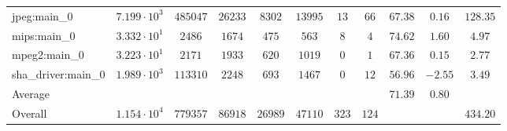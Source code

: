 \begin{tabular}{|l|c|c|c|c|c|c|c|c|c|c|}
jpeg:main\_0            & $ 7.199 \cdot 10^{3} $ & $ 485047 $ & $ 26233 $ & $ 8302  $ & $ 13995 $ & $ 13  $ & $ 66  $ & $ 67.38       $ & $ 0.16    $ & $ 128.35  $ \\
mips:main\_0            & $ 3.332 \cdot 10^{1} $ & $ 2486   $ & $ 1674  $ & $ 475   $ & $ 563   $ & $ 8   $ & $ 4   $ & $ 74.62       $ & $ 1.60    $ & $ 4.97    $ \\
mpeg2:main\_0           & $ 3.223 \cdot 10^{1} $ & $ 2171   $ & $ 1933  $ & $ 620   $ & $ 1019  $ & $ 0   $ & $ 1   $ & $ 67.36       $ & $ 0.15    $ & $ 2.77    $ \\
sha\_driver:main\_0     & $ 1.989 \cdot 10^{3} $ & $ 113310 $ & $ 2248  $ & $ 693   $ & $ 1467  $ & $ 0   $ & $ 12  $ & $ 56.96       $ & $ -2.55   $ & $ 3.49    $ \\
\hline
Average                 & $                    $ & $        $ & $       $ & $       $ & $       $ & $     $ & $     $ & $ 71.39       $ & $ 0.80    $ & $         $ \\
\hline
Overall                 & $ 1.154 \cdot 10^{4} $ & $ 779357 $ & $ 86918 $ & $ 26989 $ & $ 47110 $ & $ 323 $ & $ 124 $ & $             $ & $         $ & $ 434.20  $ \\
\hline
\end{tabular}
